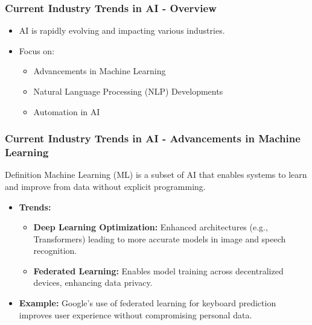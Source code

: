 \documentclass{beamer}
\begin{document}
\begin{frame}[fragile]
    \frametitle{Current Industry Trends in AI - Overview}
    \begin{itemize}
        \item AI is rapidly evolving and impacting various industries.
        \item Focus on:
        \begin{itemize}
            \item Advancements in Machine Learning
            \item Natural Language Processing (NLP) Developments
            \item Automation in AI
        \end{itemize}
    \end{itemize}
\end{frame}

\begin{frame}[fragile]
    \frametitle{Current Industry Trends in AI - Advancements in Machine Learning}
    \begin{block}{Definition}
        Machine Learning (ML) is a subset of AI that enables systems to learn and improve from data without explicit programming.
    \end{block}
    \begin{itemize}
        \item \textbf{Trends:}
        \begin{itemize}
            \item \textbf{Deep Learning Optimization:} Enhanced architectures (e.g., Transformers) leading to more accurate models in image and speech recognition.
            \item \textbf{Federated Learning:} Enables model training across decentralized devices, enhancing data privacy.
        \end{itemize}
        \item \textbf{Example:} Google’s use of federated learning for keyboard prediction improves user experience without compromising personal data.
    \end{itemize}
\end{frame}
\end{document}
